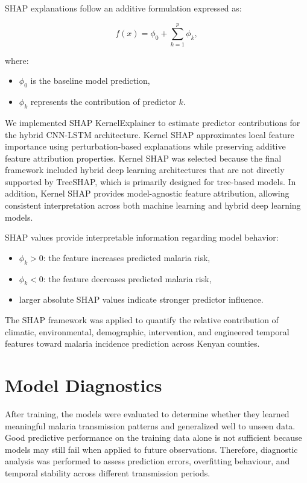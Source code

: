 SHAP explanations follow an additive formulation expressed as:

\[
f(x) = \phi_0 + \sum_{k=1}^{p} \phi_k,
\]

where:
\begin{itemize}
	\item \(\phi_0\) is the baseline model prediction,
	\item \(\phi_k\) represents the contribution of predictor \(k\).
\end{itemize}
We implemented SHAP KernelExplainer to estimate predictor contributions for the hybrid CNN-LSTM architecture. Kernel SHAP approximates local feature importance using perturbation-based explanations while preserving additive feature attribution properties.
Kernel SHAP was selected because the final framework included hybrid deep learning architectures that are not directly supported by TreeSHAP, which is primarily designed for tree-based models. In addition, Kernel SHAP provides model-agnostic feature attribution, allowing consistent interpretation across both machine learning and hybrid deep learning models.

SHAP values provide interpretable information regarding model behavior:
\begin{itemize}
	\item \(\phi_k > 0\): the feature increases predicted malaria risk,
	\item \(\phi_k < 0\): the feature decreases predicted malaria risk,
	\item larger absolute SHAP values indicate stronger predictor influence.
\end{itemize}

The SHAP framework was applied to quantify the relative contribution of climatic, environmental, demographic, intervention, and engineered temporal features toward malaria incidence prediction across Kenyan counties.



\section{Model Diagnostics}

After training, the models were evaluated to determine whether they learned meaningful malaria transmission patterns and generalized well to unseen data. Good predictive performance on the training data alone is not sufficient because models may still fail when applied to future observations. Therefore, diagnostic analysis was performed to assess prediction errors, overfitting behaviour, and temporal stability across different transmission periods.

